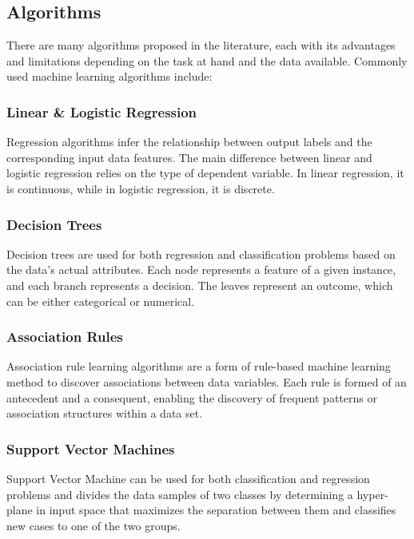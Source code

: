 \subsection{Algorithms}
\label{sec:machine_learning_algorithms}
There are many algorithms proposed in the literature, each with its advantages and limitations depending on the task at hand and the data available. Commonly used machine learning algorithms include:

\subsubsection{Linear \& Logistic Regression}

Regression algorithms infer the relationship between output labels and the corresponding input data features. The main difference between linear and logistic regression relies on the type of dependent variable. In linear regression, it is continuous, while in logistic regression, it is discrete.

\subsubsection{Decision Trees}

Decision trees are used for both regression and classification problems based on the data's actual attributes. Each node represents a feature of a given instance, and each branch represents a decision. The leaves represent an outcome, which can be either categorical or numerical.

\subsubsection{Association Rules}

Association rule learning algorithms are a form of rule-based machine learning method to discover associations between data variables. Each rule is formed of an antecedent and a consequent, enabling the discovery of frequent patterns or association structures within a data set.

\subsubsection{Support Vector Machines}

Support Vector Machine can be used for both classification and regression problems and divides the data samples of two classes by determining a hyper-plane in input space that maximizes the separation between them and classifies new cases to one of the two groups.

